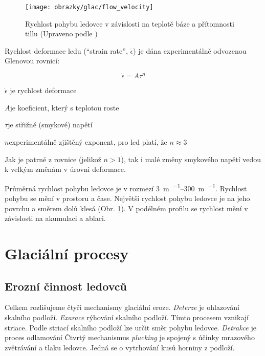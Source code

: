 \begin{figure}
	\centering
	\texttt{[image: obrazky/glac/flow\_velocity]}
	\caption{Rychlost pohybu ledovce v závislosti na teplotě báze a přítomnosti tillu (Upraveno podle \textcite{biermanKeyConceptsGeomorphology2014})}
	\label{fig:flowvelocity}
\end{figure}

Rychlost deformace ledu (\enquote{strain rate}, $\dot{\epsilon}$) je dána experimentálně odvozenou Glenovou rovnicí:

\begin{equation}
	\dot{\epsilon} = A\tau^{n}
\end{equation}

\begin{eqexpl}
	\item{$\dot{\epsilon}$} je rychlost deformace
	\item{$A$}je koeficient, který s teplotou roste
	\item{$\tau$}je střižné (smykové) napětí 
	\item{$n$}experimentálně zjištěný exponent, pro led platí, že $n \approx 3$
\end{eqexpl}

Jak je patrné z rovnice (jelikož $n > 1$), tak i malé změny smykového napětí  vedou k velkým změnám v úrovni deformace.

Průměrná rychlost pohybu ledovce je v rozmezí \SIrange{3}{300}{\metre\per\rok}. Rychlost pohybu se mění v prostoru a čase. Největší rychlost pohybu ledovce je na jeho povrchu a směrem dolů klesá (Obr. \ref{fig:flowvelocity}). V podélném profilu se rychlost mění v závislosti na akumulaci a ablaci.


\section{Glaciální procesy}

\subsection{Erozní činnost ledovců}
Celkem rozlišujeme čtyři mechanismy glaciální eroze. \emph{Deterze} je ohlazování skalního podloží. \emph{Exarace} rýhování skalního podloží. Tímto procesem vznikají striace. Podle striací skalního podloží lze určit směr pohybu ledovce. \emph{Detrakce} je proces odlamování Čtvrtý mechanismus \emph{plucking} je spojený s účinky mrazového zvětrávání a tlaku ledovce. Jedná se o vytrhování kusů horniny z podloží.

